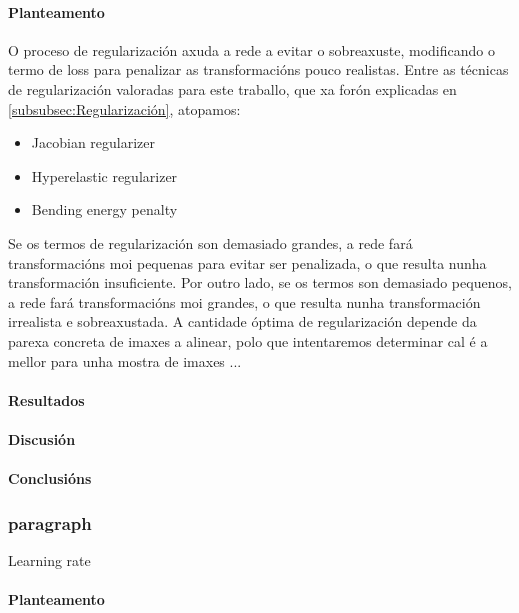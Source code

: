 \paragraph{Planteamento}
\label{par:Planteamento}

O proceso de regularización axuda a rede a evitar o sobreaxuste, modificando o termo de loss para penalizar as transformacións pouco realistas.
Entre as técnicas de regularización valoradas para este traballo, que xa forón explicadas en \ref{subsubsec:Regularización}, atopamos:

\begin{itemize}
    \item Jacobian regularizer
    \item Hyperelastic regularizer
    \item Bending energy penalty
\end{itemize}

Se os termos de regularización son demasiado grandes, a rede fará transformacións moi pequenas para evitar ser penalizada, o que resulta nunha transformación insuficiente.
Por outro lado, se os termos son demasiado pequenos, a rede fará transformacións moi grandes, o que resulta nunha transformación irrealista e sobreaxustada.
A cantidade óptima de regularización depende da parexa concreta de imaxes a alinear, polo que intentaremos determinar cal é a mellor para unha mostra de imaxes ...

\paragraph{Resultados}
\label{par:Resultados}

\paragraph{Discusión}
\label{par:Discusión}

\paragraph{Conclusións}
\label{par:Conclusións}



\subsubsection{paragraph}{Learning rate}
\label{subsubsec:Learning rate}

\paragraph{Planteamento}
\label{par:Planteamento}


